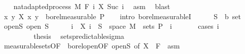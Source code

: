 \begin{isabellebody}
\ \ \isamarkupfalse%
\ nat{\isacharunderscore}{\kern0pt}adapted{\isacharunderscore}{\kern0pt}process\ M\ F\ {\isachardoublequoteopen}{\isasymlambda}i{\isachardot}{\kern0pt}\ X\ {\isacharparenleft}{\kern0pt}Suc\ i{\isacharparenright}{\kern0pt}{\isachardoublequoteclose}\ \isamarkupfalse%
\ asm\ \isamarkupfalse%
\ blast\isanewline
\ \ \isamarkupfalse%
\ {\isachardoublequoteopen}{\isacharparenleft}{\kern0pt}{\isasymlambda}{\isacharparenleft}{\kern0pt}x{\isacharcomma}{\kern0pt}\ y{\isacharparenright}{\kern0pt}{\isachardot}{\kern0pt}\ X\ x\ y{\isacharparenright}{\kern0pt}\ {\isasymin}\ borel{\isacharunderscore}{\kern0pt}measurable\ {\isasymSigma}\isactrlsub P{\isachardoublequoteclose}\isanewline
\ \ \isamarkupfalse%
\ {\isacharparenleft}{\kern0pt}intro\ borel{\isacharunderscore}{\kern0pt}measurableI{\isacharparenright}{\kern0pt}\isanewline
\ \ \ \ \isamarkupfalse%
\ S\ {\isacharcolon}{\kern0pt}{\isacharcolon}{\kern0pt}\ {\isachardoublequoteopen}{\isacharprime}{\kern0pt}b\ set{\isachardoublequoteclose}\ \isamarkupfalse%
\ open{\isacharunderscore}{\kern0pt}S{\isacharcolon}{\kern0pt}\ {\isachardoublequoteopen}open\ S{\isachardoublequoteclose}\isanewline
\ \ \ \ \isamarkupfalse%
\ {\isachardoublequoteopen}{\isacharbraceleft}{\kern0pt}i{\isacharbraceright}{\kern0pt}\ {\isasymtimes}\ {\isacharparenleft}{\kern0pt}X\ i\ {\isacharminus}{\kern0pt}{\isacharbackquote}{\kern0pt}\ S\ {\isasyminter}\ space\ M{\isacharparenright}{\kern0pt}\ {\isasymin}\ sets\ {\isasymSigma}\isactrlsub P{\isachardoublequoteclose}\ \ i\ \isanewline
\ \ \ \ \isamarkupfalse%
\ {\isacharparenleft}{\kern0pt}cases\ i{\isacharparenright}{\kern0pt}\isanewline
\ \ \ \ \ \ \isamarkupfalse%
\ {}\isanewline
\ \ \ \ \ \ \isamarkupfalse%
\ \isamarkupfalse%
\ {\isacharquery}{\kern0pt}thesis\ \isamarkupfalse%
\ sets{\isacharunderscore}{\kern0pt}predictable{\isacharunderscore}{\kern0pt}sigma\ \isanewline
\ \ \ \ \ \ \ \ \isamarkupfalse%
\ measurable{\isacharunderscore}{\kern0pt}sets{\isacharbrackleft}{\kern0pt}OF\ {\isacharunderscore}{\kern0pt}\ borel{\isacharunderscore}{\kern0pt}open{\isacharbrackleft}{\kern0pt}OF\ open{\isacharunderscore}{\kern0pt}S{\isacharbrackright}{\kern0pt}{\isacharcomma}{\kern0pt}\ of\ {\isachardoublequoteopen}X\ {}{\isachardoublequoteclose}\ {\isachardoublequoteopen}F\ {}{\isachardoublequoteclose}{\isacharbrackright}{\kern0pt}\ asm\ \isamarkupfalse%

\end{isabellebody}

